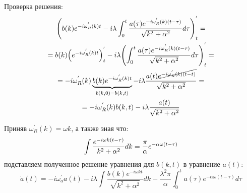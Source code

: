 Проверка решения:
\begin{multline}\notag
    \Biggl( b(k)e^{-i \omega^{'}_{R}(k) t} -i \lambda \int_{0}^{t} \frac{a(\tau)e^{-i \omega^{'}_{R}(k) (t-\tau)}}{\sqrt{k^{2} + \alpha^{2}}} d\tau \Biggr)^{'}_{t} =  \\
    = b(k) \Bigl( e^{-i \omega^{'}_{R}(k) t} \Bigr)^{'}_{t} - i \lambda \Biggl( \int_{0}^{t} \frac{a(\tau)e^{-i \omega^{'}_{R}(k) (t-\tau)}}{\sqrt{k^{2} + \alpha^{2}}} d\tau \Biggr)^{'}_{t} = \\
    = -i \omega^{'}_{R}(k) \underbrace{b(k)e^{-i \omega^{'}_{R}(k) t}}_{b(k,0) = b(k,t)} -i \lambda \frac{a(t) \cancel{e^{-i \omega^{'}_{R}(k) (t-t)}}}{\sqrt{k^{2} + \alpha^{2}}} = \\
    = -i \omega^{'}_{R}(k) b(k,t) -i \lambda \frac{a(t)}{\sqrt{k^{2} + \alpha^{2}}}
\end{multline}

Приняв $\omega^{'}_{R}(k) = \omega k$, а также зная что:
\begin{equation}\notag
    \int \frac{e^{-i \omega k (t - \tau)}}{k^{2} + \alpha^{2}} dk = \frac{\pi}{\alpha} e^{-\alpha \omega (t - \tau)}
\end{equation}
подставляем полученное решение уравнения для $b(k,t)$ в уравнение $\dot{a}(t)$:
\begin{equation}
    \dot{a}(t) =
        -i \omega^{'}_{a} a(t)
        -i \lambda \int \frac{b(k)e^{-i \omega k t}}{\sqrt{k^{2} + \alpha^2}} dk
        -\frac{\lambda^{2} \pi}{\alpha} \int_{0}^{t} a(\tau) e^{- \alpha \omega (t - \tau)} d\tau
\end{equation}

